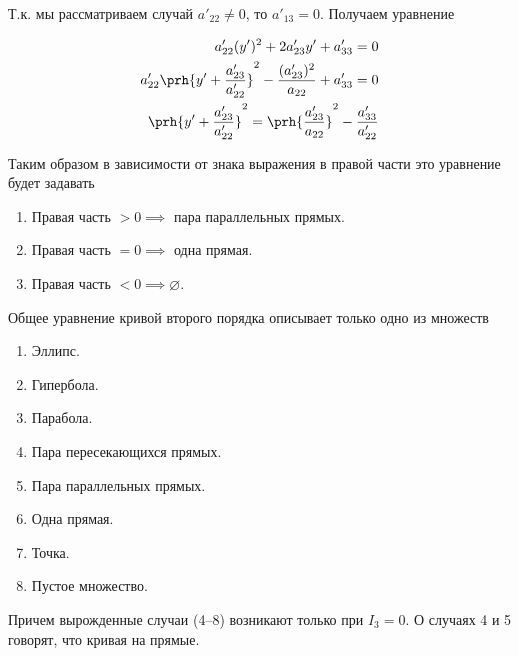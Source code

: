 Т.к. мы рассматриваем случай \(a'_{22} \neq 0\), то \(a'_{13} = 0\). Получаем
уравнение

\begin{equation*}
  \begin{aligned}
    a'_{22} (y')^2 + 2 a'_{23} y' + a'_{33} = 0
  \\  
    a'_{22} \prh{y' + \frac{a'_{23}}{a'_{22}}}^2
      - \frac{(a'_{23})^2}{a_{22}} + a'_{33} = 0
  \\
    \prh{y' + \frac{a'_{23}}{a'_{22}}}^2
    = \prh{\frac{a'_{23}}{a_{22}}}^2 - \frac{a'_{33}}{a'_{22}}
  \end{aligned}
\end{equation*}
          
Таким образом в зависимости от знака выражения в правой части это уравнение
будет задавать

\begin{enumerate}
\item
  Правая часть \(> 0 \implies\) пара параллельных прямых.

\item
  Правая часть \(= 0 \implies\) одна прямая.

\item
  Правая часть \(< 0 \implies \varnothing\).
\end{enumerate}

\begin{remark}
  Общее уравнение кривой второго порядка описывает только одно из множеств

  \begin{enumerate}  
  \item
    Эллипс.
    
  \item
    Гипербола.
    
  \item
    Парабола.
    
  \item
    Пара пересекающихся прямых.
    
  \item
    Пара параллельных прямых.
    
  \item
    Одна прямая.
    
  \item
    Точка.
    
  \item
    Пустое множество.
  \end{enumerate}

  Причем вырожденные случаи (4--8) возникают только при \(I_3 = 0\).
  О случаях 4 и 5 говорят, что кривая  на прямые.
\end{remark}
